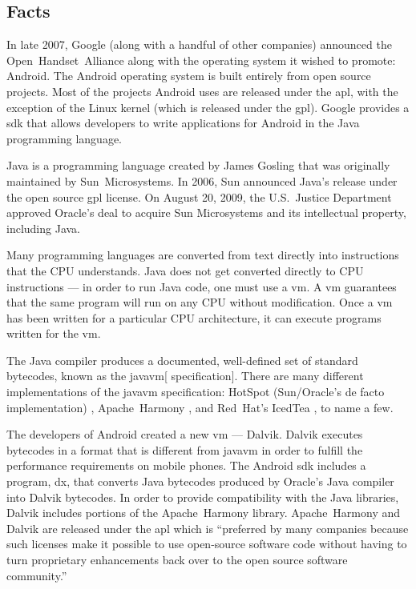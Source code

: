 \documentclass[11pt]{article}
\begin{document}
\begin{multicols}{2}
\setcounter{page}{1}

\section{Facts} %
\label{sec:facts}

In late 2007, Google (along with a handful of other companies) announced the
Open~Handset~Alliance \cite{open-handset-alliance-ann} along with the operating
system it wished to promote: Android.  The Android operating system is built
entirely from open source projects.  Most of the projects Android uses are
released under the \gls{apl}, with the exception of the Linux kernel (which is
released under the \gls{gpl}).  Google provides a \gls{sdk} that allows
developers to write applications for Android in the Java programming language.

Java is a programming language created by James Gosling that was originally
maintained by Sun~Microsystems.  In 2006, Sun announced Java's release under the
open source \gls{gpl} license. \cite{sun-open-sources-java} On August 20, 2009,
the U.S.~Justice Department approved Oracle's deal to acquire Sun Microsystems
and its intellectual property, including Java. \cite{oracle-buys-sun}

Many programming languages are converted from text directly into instructions
that the CPU understands.  Java does not get converted directly to CPU
instructions --- in order to run Java code, one must use a \gls{vm}.  A \gls{vm}
guarantees that the same program will run on any CPU without modification.  Once
a \gls{vm} has been written for a particular CPU architecture, it can execute
programs written for the \gls{vm}.

The Java compiler produces a documented, well-defined set of standard
\glspl{bytecode}, known as the \gls{javavm}[ specification]. \cite[Chapter
4]{javavm-bytecode}  There are many different implementations of the
\gls{javavm} specification: HotSpot (Sun/Oracle's de facto implementation)
\cite{hotspot}, Apache~Harmony \cite{apache-harmony}, and Red~Hat's IcedTea
\cite{icedtea}, to name a few.

The developers of Android created a new \gls{vm} --- Dalvik.  Dalvik executes
\glspl{bytecode} in a format that is different from \gls{javavm} in order to
fulfill the performance requirements on mobile phones.  \cite{dalvik-bytecode}
\cite{dalvik-vm-arch} The Android \gls{sdk} includes a program, dx, that
converts Java \glspl{bytecode} produced by Oracle's Java compiler into Dalvik
\glspl{bytecode}.  \cite{android-sdk-building} In order to provide compatibility
with the Java libraries, Dalvik includes portions of the Apache~Harmony library.
\cite{apache-harmony} \cite{dalvik-readme}  Apache~Harmony and Dalvik are
released under the \gls{apl} \cite{apache-license} which is ``preferred by many
companies because such licenses make it possible to use open-source software
code without having to turn proprietary enhancements back over to the open
source software community.'' \cite{why-apache2-license}


\end{multicols}
\end{document}

